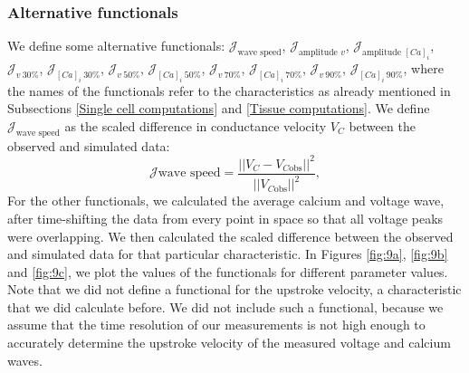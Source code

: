 \documentclass{article}
\begin{document}
\subsubsection{Alternative functionals} \label{Alternative functionals}
We define some alternative functionals: $\mathcal{J}_{\text{wave speed}}$, $\mathcal{J}_{\text{amplitude $v$}}$, $\mathcal{J}_{\text{amplitude $[Ca]_i$}}$, $\mathcal{J}_{v \:30 \%}$,
$\mathcal{J}_{[Ca]_i \:30 \%}$, $\mathcal{J}_{v \:50 \%}$,
$\mathcal{J}_{[Ca]_i \:50 \%}$,  $\mathcal{J}_{v \:70 \%}$,
$\mathcal{J}_{[Ca]_i \:70 \%}$,  $\mathcal{J}_{v \:90 \%}$,
$\mathcal{J}_{[Ca]_i \:90 \%}$, where the names of the functionals refer to the characteristics as already mentioned in Subsections \ref{Single cell computations} and \ref{Tissue computations}. We define $\mathcal{J}_{\text{wave speed}}$ as the scaled difference in conductance velocity $V_C$ between the observed and simulated data:
\begin{equation}
\mathcal{J}{\text{wave speed}} =  \frac{||V_C-V_{C \text{obs}}||^2}{||V_{C\text{obs}}||^2},\label{J_C}
\end{equation}
For the other functionals, we calculated the average calcium and voltage wave, after time-shifting the data from every point in space so that all voltage peaks were overlapping. We then calculated the scaled difference between the observed and simulated data for that particular characteristic. In Figures \ref{fig:9a}, \ref{fig:9b} and \ref{fig:9c}, we plot the values of the functionals for different parameter values. Note that we did not define a functional for the upstroke velocity, a characteristic that we did calculate before. We did not include such a functional, because we assume that the time resolution of our measurements is not high enough to accurately determine the upstroke velocity of the measured voltage and calcium waves.
\end{document}
